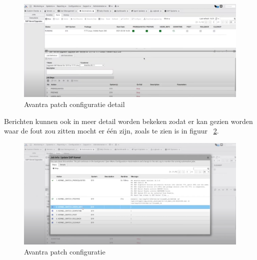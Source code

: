 \begin{figure}[h]
    \centering
    \includegraphics[width=\textwidth]{avantra2.png}
    \caption{Avantra patch configuratie detail}
     \label{fig:avantra2}
\end{figure}
\newpage

Berichten kunnen ook in meer detail worden bekeken zodat er kan gezien worden waar de fout zou zitten mocht er één zijn, zoals te zien is in figuur ~\ref{fig:avantra3}.

\begin{figure}[h]
    \centering
    \includegraphics[width=\textwidth]{avantra3.png}
    \caption{Avantra patch configuratie}
     \label{fig:avantra3}
\end{figure}
\newpage


